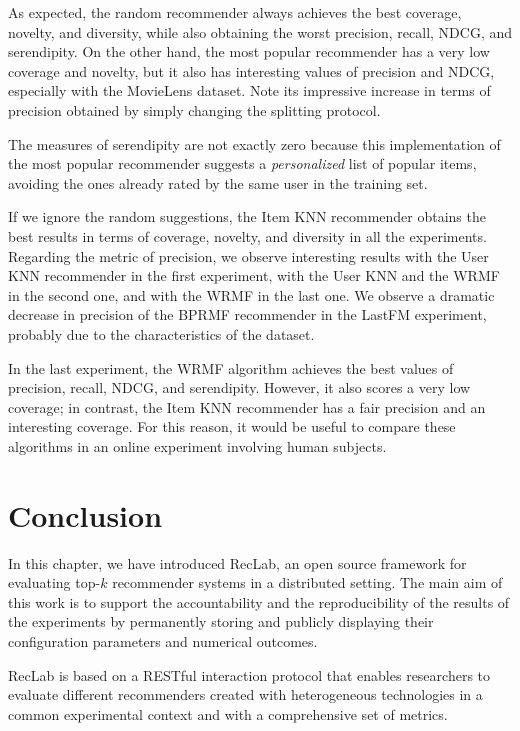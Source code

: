 As expected, the random recommender always achieves the best coverage, novelty, and diversity, while also obtaining the worst precision, recall, NDCG, and serendipity. On the other hand, the most popular recommender has a very low coverage and novelty, but it also has interesting values of precision and NDCG, especially with the MovieLens dataset. Note its impressive increase in terms of precision obtained by simply changing the splitting protocol.

The measures of serendipity are not exactly zero because this implementation of the most popular recommender suggests a \emph{personalized} list of popular items, avoiding the ones already rated by the same user in the training set.

If we ignore the random suggestions, the Item KNN recommender obtains the best results in terms of coverage, novelty, and diversity in all the experiments. Regarding the metric of precision, we observe interesting results with the User KNN recommender in the first experiment, with the User KNN and the WRMF in the second one, and with the WRMF in the last one. We observe a dramatic decrease in precision of the BPRMF recommender in the LastFM experiment, probably due to the characteristics of the dataset.

In the last experiment, the WRMF algorithm achieves the best values of precision, recall, NDCG, and serendipity. However, it also scores a very low coverage; in contrast, the Item KNN recommender has a fair precision and an interesting coverage. For this reason, it would be useful to compare these algorithms in an online experiment involving human subjects.

\section{Conclusion}
\label{lab:sec:conclusion}

In this chapter, we have introduced RecLab, an open source framework for evaluating top-$k$ recommender systems in a distributed setting. The main aim of this work is to support the accountability and the reproducibility of the results of the experiments by permanently storing and publicly displaying their configuration parameters and numerical outcomes.

RecLab is based on a RESTful interaction protocol that enables researchers to evaluate different recommenders created with heterogeneous technologies in a common experimental context and with a comprehensive set of metrics.

